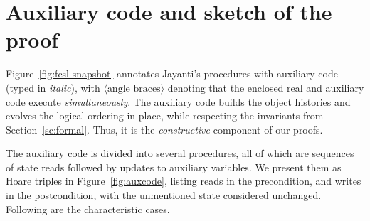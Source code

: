 

\section{Auxiliary code and sketch of the proof}
\label{sc:implementation}


Figure~\ref{fig:fcsl-snapshot} annotates Jayanti's procedures with
auxiliary code (typed in \emph{italic}), with
$\langle\mbox{angle braces}\rangle$ denoting that the enclosed real
and auxiliary code execute \emph{simultaneously}. The auxiliary code
builds the object histories and evolves the logical ordering in-place,
while respecting the invariants from Section~\ref{sc:formal}. Thus, it
is the \emph{constructive} component of our proofs.

%
%
%

The auxiliary code is divided into several procedures, all of which
are sequences of state reads followed by updates to auxiliary
variables. We present them as Hoare triples in
Figure~\ref{fig:auxcode}, listing reads in the precondition, and
writes in the postcondition, with the unmentioned state considered
unchanged. Following are the characteristic cases.

%




